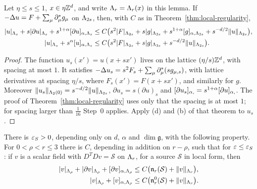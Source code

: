 \begin{lemma}\label{lem:rescaled}
Let $\eta\le s\le1$, $x\in\eta\mathbb Z^d$, and write $\Lambda_r=\Lambda_r(x)$ in this lemma. If $-\Delta u=F+\sum_\mu\partial^*_\mu g_\mu$ on $\Lambda_{2s}$, then, with $C$ as in Theorem~\ref{thm:local-regularity},
\begin{align*}
|u|_{\Lambda_s}+s|\partial u|_{\Lambda_s}+s^{1+\alpha}[\partial u]_{\alpha,\Lambda_s}&\le C\big(s^2|F|_{\Lambda_{2s}}+s|g|_{\Lambda_{3s}}+s^{1+\alpha}[g]_{\alpha,\Lambda_{3s}}+s^{-d/2}\|u\|_{\Lambda_{2s}}\big),\\
|u|_{\Lambda_s}+s^\alpha[u]_{\alpha,\Lambda_s}&\le C\big(s^2|F|_{\Lambda_{2s}}+s|g|_{\Lambda_{3s}}+s^{-d/2}\|u\|_{\Lambda_{2s}}\big).
\end{align*}
\end{lemma}

\begin{proof}
The function $u_s(x')=u(x+sx')$ lives on the lattice $(\eta/s)\mathbb Z^d$, with spacing at most $1$. It satisfies $-\Delta u_s=s^2F_s+\sum_\mu\partial^*_\mu(sg_{\mu,s})$, with lattice derivatives at spacing $\eta/s$, where $F_s(x')=F(x+sx')$, and similarly for $g$. Moreover $\|u_s\|_{\Lambda_2(0)}=s^{-d/2}\|u\|_{\Lambda_{2s}}$, $\partial u_s=s(\partial u)_s$ and $[\partial u_s]_{\alpha,}=s^{1+\alpha}[\partial u]_{\alpha,}$. The proof of Theorem~\ref{thm:local-regularity} uses only that the spacing is at most $1$; for spacing larger than $\frac1{16}$ Step~0 applies. Apply (d) and (b) of that theorem to $u_s$.
\end{proof}

\begin{proposition}\label{prop:scalar-interior}
There is $\varepsilon_S>0$, depending only on $d$, $\alpha$ and $\dim\mathfrak g$, with the following property. For $0<\rho<r\le3$ there is $C$, depending in addition on $r-\rho$, such that for $\varepsilon\le\varepsilon_S$: if $v$ is a scalar field with $D^TDv=\mathcal S$ on $\Lambda_r$, for a source $\mathcal S$ in local form, then
\begin{align*}
|v|_{\Lambda_\rho}+|\partial v|_{\Lambda_\rho}+[\partial v]_{\alpha,\Lambda_\rho}&\le C\big(\mathfrak n_r(\mathcal S)+\|v\|_{\Lambda_r}\big),\\
|v|_{\Lambda_\rho}+[v]_{\alpha,\Lambda_\rho}&\le C\big(\mathfrak n^0_r(\mathcal S)+\|v\|_{\Lambda_r}\big).
\end{align*}
\end{proposition}

